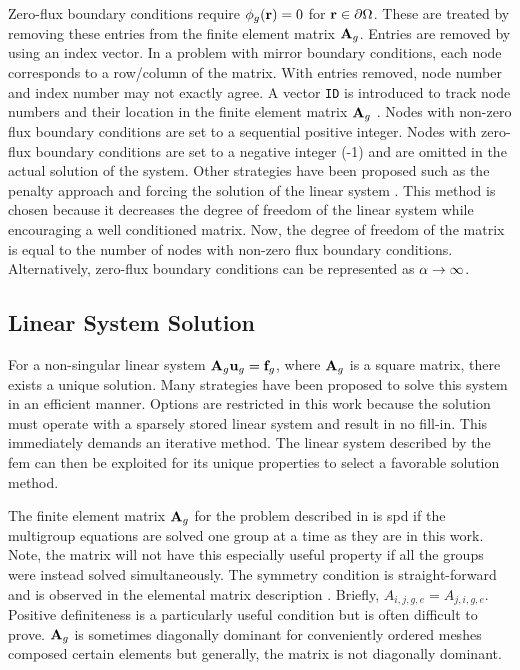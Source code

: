     Zero-flux boundary conditions require $\phi_g(\mathbf{r}) = 0$ for $\mathbf{r} \in
    \partial \Omega$. These are treated by removing these entries from the
    finite element matrix $\mathbf{A}_g$. Entries are removed by using an index vector.
    In a problem with mirror boundary conditions, each node corresponds to a
    row/column of the matrix. With entries removed, node number and index number
    may not exactly agree. A vector \texttt{ID} is introduced to track node
    numbers and their location in the finite element matrix $\mathbf{A}_g$
    \cite{textbookjohnson}. Nodes with non-zero flux boundary conditions are set
    to a sequential positive integer. Nodes with zero-flux boundary conditions
    are set to a negative integer (-1) and are omitted in the actual solution of
    the system. Other strategies have been proposed such as the penalty approach
    \cite{textbookhughes} and forcing the solution of the linear system
    \cite{textbookli}. This method is chosen because it decreases the degree of
    freedom of the linear system while encouraging a well conditioned matrix.
    Now, the degree of freedom of the matrix is equal to the number of nodes
    with non-zero flux boundary conditions. Alternatively, zero-flux boundary
    conditions can be represented as $\alpha \rightarrow \infty$.
    
  \subsection{Linear System Solution}
    \label{sec:linear_system_solution}
    For a non-singular linear system $\mathbf{A}_g \mathbf{u}_g = \mathbf{f}_g$, where $\mathbf{A}_g$ is a 
    square matrix, there exists a unique solution. Many strategies have been 
    proposed to solve this system in an efficient manner. Options are restricted
    in this work because the solution must operate with a sparsely stored linear
    system and result in no fill-in. This immediately demands an iterative
    method. The linear system described by the \gls{fem} can then be exploited
    for its unique properties to select a favorable solution method.
    
    The finite element matrix $\mathbf{A}_g$ for the problem described in
     is \gls{spd} if the multigroup equations are
    solved one group at a time as they are in this work. Note, the matrix will 
    not have this especially useful property if all the groups were instead
    solved simultaneously. The symmetry condition is straight-forward and is
    observed in the elemental matrix description .
    Briefly, ${A_{i,j,g,e}=A_{j,i,g,e}}$.  Positive definiteness is a
    particularly useful condition but is often difficult to prove. $\mathbf{A}_g$ is
    sometimes diagonally dominant for conveniently ordered meshes composed
    certain elements but generally, the matrix is not diagonally dominant. 
    

